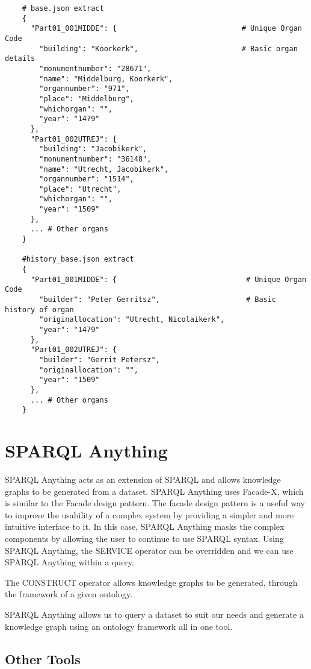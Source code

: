 \begin{lstlisting}
    # base.json extract
    {
      "Part01_001MIDDE": {                             # Unique Organ Code
        "building": "Koorkerk",                        # Basic organ details
        "monumentnumber": "28671",
        "name": "Middelburg, Koorkerk",
        "organnumber": "971",
        "place": "Middelburg",
        "whichorgan": "",
        "year": "1479"
      },
      "Part01_002UTREJ": {
        "building": "Jacobikerk",
        "monumentnumber": "36148",
        "name": "Utrecht, Jacobikerk",
        "organnumber": "1514",
        "place": "Utrecht",
        "whichorgan": "",
        "year": "1509"
      },
      ... # Other organs
    }

    #history_base.json extract
    {
      "Part01_001MIDDE": {                              # Unique Organ Code
        "builder": "Peter Gerritsz",                    # Basic history of organ
        "originallocation": "Utrecht, Nicolaikerk",
        "year": "1479"
      },
      "Part01_002UTREJ": {
        "builder": "Gerrit Petersz",
        "originallocation": "",
        "year": "1509"
      },
      ... # Other organs
    }
\end{lstlisting}



\section{SPARQL Anything}
\hspace{0.5cm} SPARQL Anything acts as an extension of SPARQL and allows knowledge graphs to be generated from a dataset. SPARQL Anything uses Facade-X, which is similar to the Facade design pattern. The facade design pattern is a useful way to improve the usability of a complex system by providing a simpler and more intuitive interface to it. In this case, SPARQL Anything masks the complex components by allowing the user to continue to use SPARQL syntax. Using SPARQL Anything, the SERVICE operator can  be overridden and we can use SPARQL Anything within a query. \cite{sparqlanything}

The CONSTRUCT operator allows knowledge graphs to be generated, through the framework of a given ontology. \cite{sparqlanythinggithub}

SPARQL Anything allows us to query a dataset to suit our needs and generate a knowledge graph using an ontology framework all in one tool. \cite{sparqlanythinggithub}

\subsection{Other Tools}

